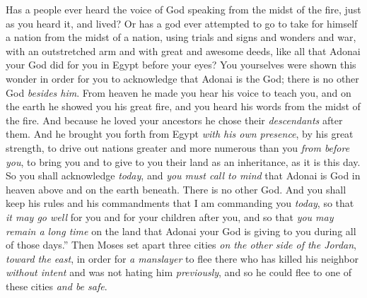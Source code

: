 \begin{biblechapter}
\verse Has a people ever heard the voice of God speaking from the midst of the fire, just as you heard it, and lived?
\verse Or has a god ever attempted to go to take for himself a nation from the midst of a nation, using trials and signs and wonders and war, with an outstretched arm and with great and awesome deeds, like all that Adonai your God did for you in Egypt before your eyes?
\verse You yourselves were shown this wonder in order for you to acknowledge that Adonai is the God; there is no other God \textit{besides him}.
\verse From heaven he made you hear his voice to teach you, and on the earth he showed you his great fire, and you heard his words from the midst of the fire.
\verse And because he loved your ancestors he chose their \textit{descendants} after them. And he brought you forth from Egypt \textit{with his own presence}, by his great strength,
\verse to drive out nations greater and more numerous than you \textit{from before you}, to bring you and to give to you their land as an inheritance, as it is this day.
\verse So you shall acknowledge \textit{today}, and \textit{you must call to mind} that Adonai is God in heaven above and on the earth beneath. There is no other God.
\verse And you shall keep his rules and his commandments that I am commanding you \textit{today}, so that \textit{it may go well} for you and for your children after you, and so that \textit{you may remain a long time} on the land that Adonai your God is giving to you during all of those days.”
\verse Then Moses set apart three cities \textit{on the other side of the Jordan}, \textit{toward the east},
\verse in order for \textit{a manslayer} to flee there who has killed his neighbor \textit{without intent} and was not hating him \textit{previously}, and so he could flee to one of these cities \textit{and be safe}.

\end{biblechapter}
